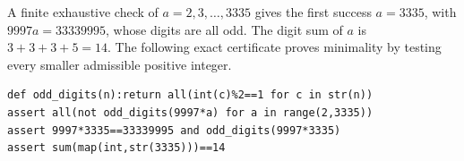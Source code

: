 A finite exhaustive check of $a=2,3,\ldots,3335$ gives the first success $a=3335$, with $9997a=33339995$, whose digits are all odd. The digit sum of $a$ is $3+3+3+5=\boxed{14}$. The following exact certificate proves minimality by testing every smaller admissible positive integer.
\begin{verbatim}
def odd_digits(n):return all(int(c)%2==1 for c in str(n))
assert all(not odd_digits(9997*a) for a in range(2,3335))
assert 9997*3335==33339995 and odd_digits(9997*3335)
assert sum(map(int,str(3335)))==14
\end{verbatim}
